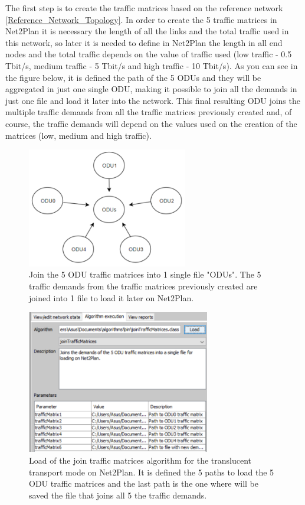 \noindent
The first step is to create the traffic matrices based on the reference network \ref{Reference_Network_Topology}. In order to create the 5 traffic matrices in Net2Plan it is necessary the length of all the links and the total traffic used in this network, so later it is needed to define in Net2Plan the length in all end nodes and the total traffic depends on the value of traffic used (low traffic - 0.5 Tbit/s, medium traffic - 5 Tbit/s and high traffic - 10 Tbit/s). As you can see in the figure below, it is defined the path of the 5 ODUs and they will be aggregated in just one single ODU, making it possible to join all the demands in just one file and load it later into the network. This final resulting ODU joins the multiple traffic demands from all the traffic matrices previously created and, of course, the traffic demands will depend on the values used on the creation of the matrices (low, medium and high traffic).

\begin{figure}[h!]
\centering
\includegraphics[width=7cm]{sdf/heuristic/translucent_protection/figures/join_matrices_odus}
\caption{Join the 5 ODU traffic matrices into 1 single file "ODUs". The 5 traffic demands from the traffic matrices previously created are joined into 1 file to load it later on Net2Plan.}
\label{join_matrices_odus_protec_transl}
\end{figure}

\begin{figure}[h!]
\centering
\includegraphics[width=8cm]{sdf/heuristic/translucent_protection/figures/traffic_matrices}
\caption{Load of the join traffic matrices algorithm for the translucent transport mode on Net2Plan. It is defined the 5 paths to load the 5 ODU traffic matrices and the last path is the one where will be saved the file that joins all 5 the traffic demands.}
\label{traffic_matrices_transl_protec_ref}
\end{figure}

